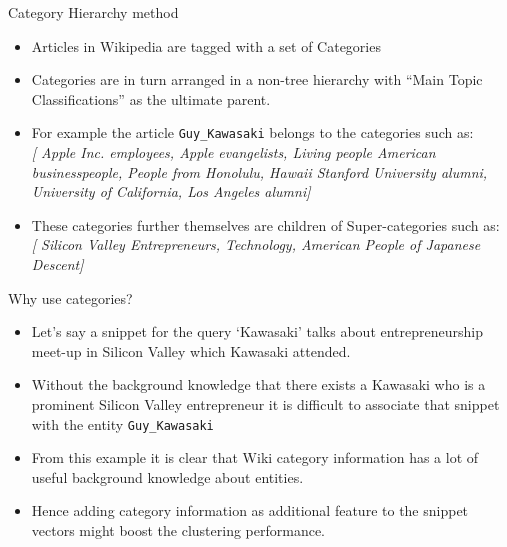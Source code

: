 \documentclass{beamer}
\begin{document}
\begin{frame}[fragile]{Category Hierarchy method}
\begin{itemize}
\item Articles in Wikipedia are tagged with a set of Categories 
\item Categories are in turn arranged in a non-tree hierarchy with ``Main Topic
  Classifications'' as the ultimate parent.
\item For example the article \verb|Guy_Kawasaki|
  belongs to the categories such as: \\
{\it
[ Apple Inc. employees, Apple evangelists, Living people
American businesspeople, People from Honolulu, Hawaii
Stanford University alumni, University of California, Los Angeles alumni]}
\item These categories further themselves are children of
  Super-categories such as: \\
{\it
[ Silicon Valley Entrepreneurs, Technology, American People of Japanese Descent]
}

\end{itemize}

\end{frame}

\begin{frame}[fragile]{Why use categories?}
\begin{itemize}
  \item Let's say a snippet for the query `Kawasaki' talks about
    entrepreneurship meet-up in Silicon Valley which Kawasaki
    attended.
  \item  Without the background knowledge that there exists a
    Kawasaki who is a prominent Silicon Valley entrepreneur it is
    difficult to associate that snippet with the entity
    \verb|Guy_Kawasaki|
  \item From this example it is clear that Wiki category information
    has a lot of useful background knowledge about entities.
  \item Hence adding category information as additional feature to the
    snippet vectors might boost the clustering performance.
\end{itemize}

\end{frame}
\end{document}

